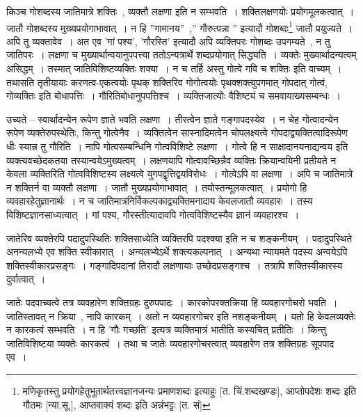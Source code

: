 				किञ्च गोशब्दस्य जातिमात्रे शक्तिः~, व्यक्तौ लक्षणा इति न सम्भवति~।  शक्तिलक्षणयोः प्रयोगमूलकत्वात्~।  जातौ गोशब्दस्य मुख्यप्रयोगाभावात्~।  न हि ”गामानय”~,” गौरुत्पन्ना ” इत्यादौ गोशब्दः\footnote{मणिकृतस्तु प्रयोगहेतुभूतार्थतत्त्वज्ञानजन्यः प्रमाणशब्दः इत्याहुः [त. चिं.शब्दखण्डः], आप्तोपदेशः शब्दः इति गौतमः [न्या.सू.], आप्तवाक्यं शब्दः इति अन्नंभट्टः [त. सं]} जातौ प्रयुज्यते~।  अपि तु व्यक्तावेव~।  अत एव ’गां पश्य’, ’गौरस्ति’ इत्यादौ अपि व्यक्तिपरः गोशब्दः उपगम्यते~, न तु जातिपरः~।  लक्षणा च मुख्यार्थान्वयानुपपत्त्या ततोऽन्यत्रार्थे शब्दप्रयोगात् सिद्ध्यति~।  व्यक्तेः मुख्यार्थादन्यत्वम् असिद्धम्~।  तस्मात् जातिविशिष्टव्यक्तिः शक्या~।  न च तर्हि अस्तु गोत्वे गवि च शक्तिः इति वाच्यम्~।  तथासति तृतीयायाः करणत्व-एकत्वयोः पृथक् शक्तिरिव गोगोत्वयोः पृथक्शक्त्युपगमात् गोपदात् गोत्वं, गोव्यक्तिः इति बोधापत्तिः~।  गौरितिबोधानुपपत्तिश्च~।  व्यक्तिजात्योः वैशिष्ट्यं च समवायाख्यसम्बन्धः~।

				\begin{small}
				
					उच्यते – स्वार्थादन्येन रूपेण ज्ञाते भवति लक्षणा~। तीरत्वेन ज्ञाते गङ्गापदस्येव~। न चेह गोत्वादन्येन रूपेण व्यक्तेरुपस्थेतिः, किन्तु गोत्वेनैव~। व्यक्तित्वेन सास्नादिमत्वेन चोपलक्ष्यत्वे गोपदाद्व्यक्तित्वादिरूपेण धीः स्यान्न तु गौरिति~। नापि गोत्वसम्बन्धिनि गोत्वविशिष्टे लक्षणा~। गोत्वे हि न साक्षादानयनाद्यन्वय इति व्यक्त्यवच्छेदकतया तस्यान्वयेऽमुख्यत्वम्~। लक्षणयापि गोत्वावच्छिन्नैव व्यक्तिः क्रियान्वयिनी प्रतीयते न केवला व्यक्तिरिति गोत्वविशिष्टस्य लक्ष्यत्वे युगपद्वृत्तिद्वयविरोधः~। गोत्वेऽपि वा लक्षणा~। अपि च जातिमात्रे न शक्तिर्न वा व्यक्तौ लक्षणा~। जातौ मुख्यप्रयोगाभावात्~। तयोस्तन्मूलकत्वात्~। प्रयोगो हि व्यवहारहेतुज्ञानार्थः~। न च जातिमात्रनिर्विकल्पकाद्व्यक्तिमनादाय केवलजातौ व्यवहारः~। तस्य विशिष्टज्ञानसाध्यत्वात्~। गां पश्य, गौरस्तीत्यादावपि गोत्वविशिष्टस्यैव ज्ञानं व्यवहारश्च~।
				\end{small}

	जातेरिव व्यक्तेरपि पदादुपस्थितिः शक्तिसाध्येति व्यक्तिरपि पदश्क्या इति न च शङ्कनीयम्~। पदादुपस्थिते अनन्यलभ्ये एव शक्ति स्वीकारात्~। अन्यलभ्येऽर्थे शक्त्यकल्पनात्~। अन्यथा न्यायमते पदस्य अन्वयेऽपि शक्तिस्वीकारप्रसङ्गः~। गङ्गादिपदानां तिरादौ लक्षणायाः उच्छेदप्रसङ्गश्च~। तत्रापि शक्तिस्वीकारस्य दुर्वात्वात्~।

	जातेः पदवाच्यत्वे तत्र व्यवहारेण  शक्तिग्रहः दुरुपपादः~। कारकोपरक्तक्रिया हि व्यवहारगोचरो भवति~। जातिस्तावत् न क्रिया~, नापि कारकम्~। अतो न व्यवहारगोचर इति नशङ्कनीयम्~। यतो हि केवलव्यक्तेः न कारकत्वं सम्भवति~। न हि 'गौः गच्छति' इत्यत्र व्यक्तिमात्रं भातीति कस्यचित् प्रतीतिः~। किन्तु जातिविशिष्टया व्यक्तेः कारकत्वं~। तथा च जातेः व्यवहारगोचरत्वात् व्यवहारेण तत्र शक्तिग्रहः सूपपाद एव~।



